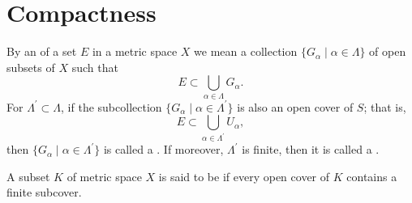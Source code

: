 \section{Compactness}
\begin{definition}
By an  of a set $E$ in a metric space $X$ we mean a collection $\{G_\alpha\mid\alpha\in\Lambda\}$ of open subsets of $X$ such that
\[ E\subset\bigcup_{\alpha\in\Lambda}G_\alpha. \]
For $\Lambda^\prime\subset\Lambda$, if the subcollection $\{G_\alpha\mid\alpha\in\Lambda^\prime\}$ is also an open cover of $S$; that is,
\[ E\subset\bigcup_{\alpha\in\Lambda^\prime}U_\alpha, \]
then $\{G_\alpha\mid\alpha\in\Lambda^\prime\}$ is called a . If moreover, $\Lambda^\prime$ is finite, then it is called a .
\end{definition}

\begin{definition}
A subset $K$ of metric space $X$ is said to be  if every open cover of $K$ contains a finite subcover.
\end{definition}

